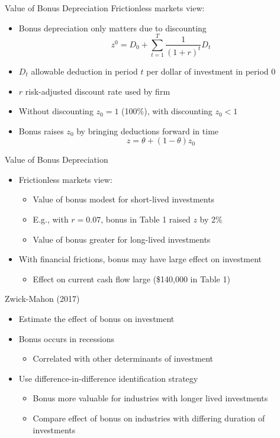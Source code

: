 \documentclass[english,xcolor=svgnames,aspectratio=169]{beamer}
\begin{document}
\begin{frame}{Value of Bonus Depreciation}
Frictionless markets view:
\begin{itemize}
	\item Bonus depreciation only matters due to discounting
	\[ z^0 = D_0 + \sum_{t=1}^{T} \frac{1}{(1+r)^t} D_t \]
	\item $D_t$ allowable deduction in period $t$ per dollar of investment in period $0$
	\item $r$ risk-adjusted discount rate used by firm
	\item Without discounting $z_0 = 1$ (100\%), with discounting $z_0 < 1$
	\item Bonus raises $z_0$ by bringing deductions forward in time
	\[z = \theta + (1-\theta) z_0 \] 	
\end{itemize}
\end{frame}


\begin{frame}{Value of Bonus Depreciation}
\begin{itemize}
	\itemsep1em 
	\item Frictionless markets view:
	\begin{itemize}
		\item Value of bonus modest for short-lived investments
		\item E.g., with $r = 0.07$, bonus in Table 1 raised $z$ by 2\%
		\item Value of bonus greater for long-lived investments
	\end{itemize}
	\item With financial frictions, bonus may have large effect on investment
	\begin{itemize}
		\item Effect on current cash flow large (\$140,000 in Table 1) 
	\end{itemize}
\end{itemize}
\end{frame}


\begin{frame}{Zwick-Mahon (2017)}
\begin{itemize}
	\itemsep1em 
	\item Estimate the effect of bonus on investment
	\item Bonus occurs in recessions
	\begin{itemize}
		\item Correlated with other determinants of investment
	\end{itemize}
	\item Use difference-in-difference identification strategy
	\begin{itemize}
		\item Bonus more valuable for industries with longer lived investments
		\item Compare effect of bonus on industries with differing duration of investments 
	\end{itemize}
\end{itemize}
\end{frame}
\end{document}
